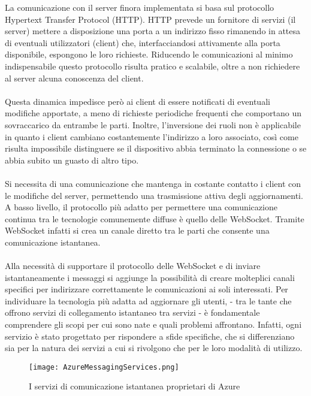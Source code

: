 La comunicazione con il server finora implementata 
si basa sul protocollo Hypertext Transfer Protocol (HTTP). 
HTTP prevede un fornitore di servizi (il server) mettere a disposizione una porta 
a un indirizzo fisso rimanendo in attesa di eventuali utilizzatori (client) che, 
interfacciandosi attivamente alla porta disponibile, espongono le loro richieste.
Riducendo le comunicazioni al minimo indispensabile
questo protocollo risulta pratico e scalabile,
oltre a non richiedere al server alcuna conoscenza del client.\\
\\
Questa dinamica impedisce però ai client 
di essere notificati di eventuali modifiche apportate, 
a meno di richieste periodiche frequenti che comportano un sovraccarico da entrambe le parti. 
Inoltre, l'inversione dei ruoli non è applicabile 
in quanto i client cambiano costantemente l'indirizzo a loro associato, 
così come risulta impossibile distinguere se il dispositivo abbia terminato la connessione
o se abbia subito un guasto di altro tipo.\\
\\
Si necessita di una comunicazione che mantenga in costante contatto 
i client con le modifiche del server, 
permettendo una trasmissione attiva degli aggiornamenti.
A basso livello, il protocollo più adatto per permettere una comunicazione continua 
tra le tecnologie comunemente diffuse è quello delle WebSocket. 
Tramite WebSocket infatti si crea un canale diretto tra le parti 
che consente una comunicazione istantanea.\\
\\
Alla necessità di supportare il protocollo delle WebSocket e
di inviare istantaneamente i messaggi
si aggiunge la possibilità di creare molteplici canali specifici 
per indirizzare correttamente le comunicazioni ai soli interessati.
\clearpage
Per individuare la tecnologia più adatta ad aggiornare gli utenti,
- tra le tante che offrono servizi di collegamento istantaneo tra servizi -
è fondamentale comprendere gli scopi per cui sono nate e quali problemi affrontano. 
Infatti, ogni servizio è stato progettato per rispondere a sfide specifiche,
che si differenziano sia per la natura dei servizi a cui si rivolgono
che per le loro modalità di utilizzo.\\
\begin{figure}[h!]
    \centering
    \texttt{[image: AzureMessagingServices.png]}
    \caption{I servizi di comunicazione istantanea proprietari di Azure}
\end{figure}\\
